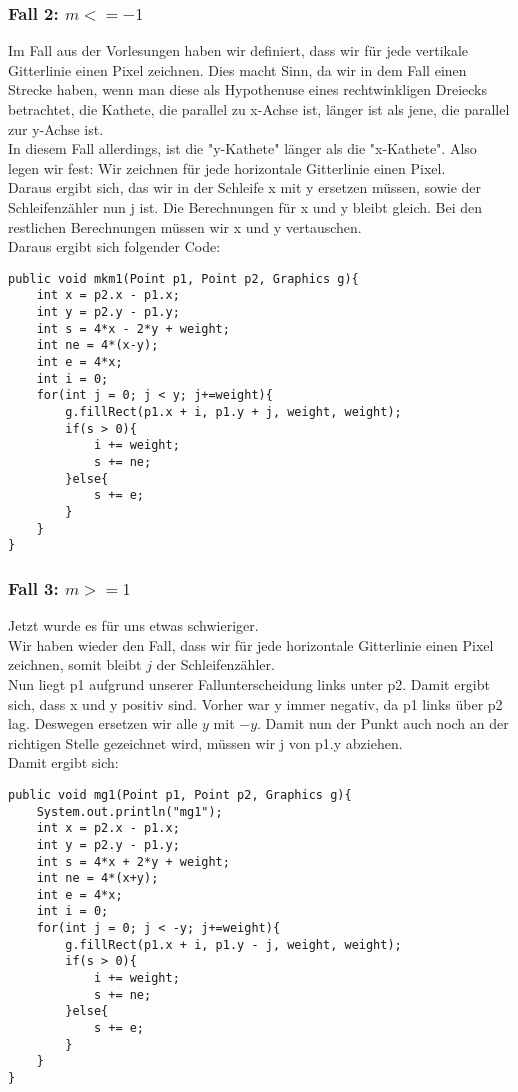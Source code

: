 \documentclass[a4paper,10pt]{article}
\begin{document}
\subsubsection{Fall 2: $m <= -1$}
Im Fall aus der Vorlesungen haben wir definiert, dass wir für jede vertikale Gitterlinie einen Pixel zeichnen. Dies macht Sinn, da wir in dem Fall einen Strecke haben, wenn man diese als Hypothenuse eines rechtwinkligen Dreiecks betrachtet, die Kathete, die parallel zu x-Achse ist, länger ist als jene, die parallel zur y-Achse ist.\\
In diesem Fall allerdings, ist die "y-Kathete" länger als die "x-Kathete". Also legen wir fest: Wir zeichnen für jede horizontale Gitterlinie einen Pixel.\\
Daraus ergibt sich, das wir in der Schleife x mit y ersetzen müssen, sowie der Schleifenzähler nun j ist. Die Berechnungen für x und y bleibt gleich. Bei den restlichen Berechnungen müssen wir x und y vertauschen.\\Daraus ergibt sich folgender Code:
\begin{lstlisting}
public void mkm1(Point p1, Point p2, Graphics g){
    int x = p2.x - p1.x;
    int y = p2.y - p1.y;
    int s = 4*x - 2*y + weight;
    int ne = 4*(x-y);
    int e = 4*x;
    int i = 0;
    for(int j = 0; j < y; j+=weight){
        g.fillRect(p1.x + i, p1.y + j, weight, weight);
        if(s > 0){
            i += weight;
            s += ne;
        }else{
            s += e;
        }
    }
}
\end{lstlisting}
\subsubsection{Fall 3: $m >= 1$}
Jetzt wurde es für uns etwas schwieriger.\\Wir haben wieder den Fall, dass wir für jede horizontale Gitterlinie einen Pixel zeichnen, somit bleibt $j$ der Schleifenzähler.\\ Nun liegt p1 aufgrund unserer Fallunterscheidung links unter p2. Damit ergibt sich, dass x und y positiv sind. Vorher war y immer negativ, da p1 links über p2 lag. Deswegen ersetzen wir alle $y$ mit $-y$. Damit nun der Punkt auch noch an der richtigen Stelle gezeichnet wird, müssen wir j von p1.y abziehen.\\Damit ergibt sich:
\begin{lstlisting}
public void mg1(Point p1, Point p2, Graphics g){
    System.out.println("mg1");
    int x = p2.x - p1.x;
    int y = p2.y - p1.y;
    int s = 4*x + 2*y + weight;
    int ne = 4*(x+y);
    int e = 4*x;
    int i = 0;
    for(int j = 0; j < -y; j+=weight){
        g.fillRect(p1.x + i, p1.y - j, weight, weight);
        if(s > 0){
            i += weight;
            s += ne;
        }else{
            s += e;
        }
    }
}
\end{lstlisting}
\end{document}

